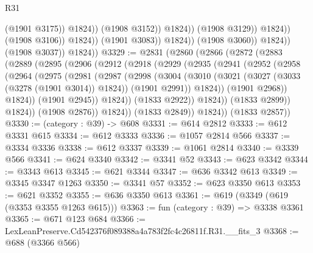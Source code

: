 \begin{lexlean}{R31}
\begin{coremodule}
                                              (@1901 @3175))
                                            @1824))
                                        (@1908 @3152))
                                      @1824))
                                  (@1908 @3129))
                                @1824))
                            (@1908 @3106))
                          @1824))
                      (@1901 @3083))
                    @1824))
                (@1908 @3060))
              @1824))
          (@1908 @3037))
        @1824))
@3329 := @2831
    (@2860
      (@2866
        (@2872
          (@2883
            (@2889
              (@2895
                (@2906
                  (@2912
                    (@2918
                      (@2929
                        (@2935
                          (@2941
                            (@2952
                              (@2958
                                (@2964
                                  (@2975
                                    (@2981
                                      (@2987
                                        (@2998
                                          (@3004
                                            (@3010
                                              (@3021
                                                (@3027 (@3033 (@3278 (@1901 @3014)) @1824))
                                                (@1901 @2991))
                                              @1824))
                                          (@1901 @2968))
                                        @1824))
                                    (@1901 @2945))
                                  @1824))
                              (@1833 @2922))
                            @1824))
                        (@1833 @2899))
                      @1824))
                  (@1908 @2876))
                @1824))
            (@1833 @2849))
          @1824))
      (@1833 @2857))
@3330 := (category : @39) -> @608
@3331 := @614 @2812
@3333 := @612 @3331 @615
@3334 := @612 @3333
@3336 := @1057 @2814 @566
@3337 := @3334 @3336
@3338 := @612 @3337
@3339 := @1061 @2814
@3340 := @3339 @566
@3341 := @624 @3340
@3342 := @3341 @52
@3343 := @623 @3342
@3344 := @3343 @613
@3345 := @621 @3344
@3347 := @636 @3342 @613
@3349 := @3345 @3347 @1263
@3350 := @3341 @57
@3352 := @623 @3350 @613
@3353 := @621 @3352
@3355 := @636 @3350 @613
@3361 := @619 (@3349 (@619 (@3353 @3355 @1263 @615)))
@3363 := fun (category : @39) => @3338 @3361
@3365 := @671 @123 @684
@3366 := LexLeanPreserve.Cd542376f089388a4a783f2fc4c26811f.R31.__fits_3
@3368 := @688 (@3366 @566)

\end{coremodule}
\end{lexlean}
